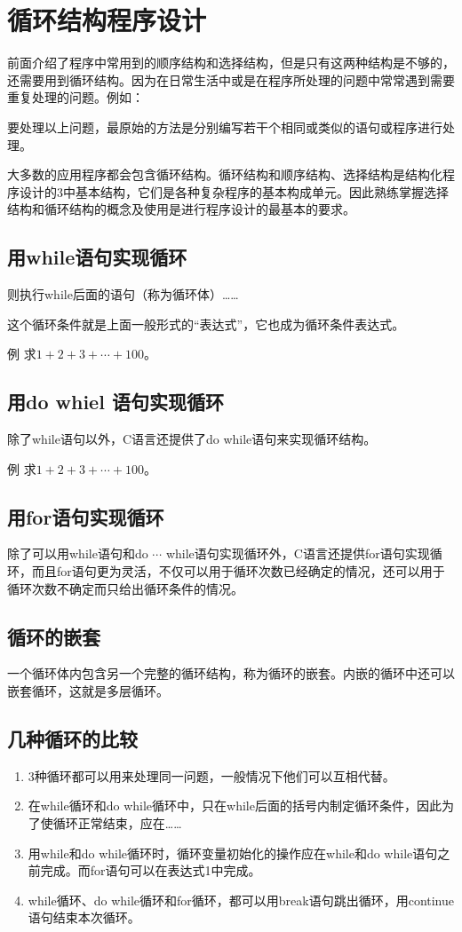 \chapter{循环结构程序设计}
前面介绍了程序中常用到的顺序结构和选择结构，但是只有这两种结构是不够的，还需要用到循环结构。因为在日常生活中或是在程序所处理的问题中常常遇到需要重复处理的问题。例如：

要处理以上问题，最原始的方法是分别编写若干个相同或类似的语句或程序进行处理。

大多数的应用程序都会包含循环结构。循环结构和顺序结构、选择结构是结构化程序设计的3中基本结构，它们是各种复杂程序的基本构成单元。因此熟练掌握选择结构和循环结构的概念及使用是进行程序设计的最基本的要求。
\section{用while语句实现循环}
则执行while后面的语句（称为循环体）……

这个循环条件就是上面一般形式的“表达式”，它也成为循环条件表达式。

例 求$1+2+3+\cdots +100$。
\section{用do whiel 语句实现循环}
除了while语句以外，C语言还提供了do while语句来实现循环结构。

例 求$1+2+3+\cdots +100$。
\section{用for语句实现循环}
除了可以用while语句和do $\cdots$ while语句实现循环外，C语言还提供for语句实现循环，而且for语句更为灵活，不仅可以用于循环次数已经确定的情况，还可以用于循环次数不确定而只给出循环条件的情况。
\section{循环的嵌套}
一个循环体内包含另一个完整的循环结构，称为循环的嵌套。内嵌的循环中还可以嵌套循环，这就是多层循环。
\section{几种循环的比较}
\begin{enumerate}
	\item 3种循环都可以用来处理同一问题，一般情况下他们可以互相代替。
	\item 在while循环和do while循环中，只在while后面的括号内制定循环条件，因此为了使循环正常结束，应在……
	\item 用while和do while循环时，循环变量初始化的操作应在while和do while语句之前完成。而for语句可以在表达式1中完成。
	\item while循环、do while循环和for循环，都可以用break语句跳出循环，用continue语句结束本次循环。
\end{enumerate}
